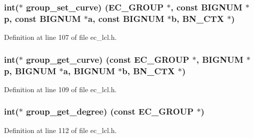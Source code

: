 \subsubsection[{\texorpdfstring{group\+\_\+set\+\_\+curve}{group_set_curve}}]{\setlength{\rightskip}{0pt plus 5cm}int($\ast$ group\+\_\+set\+\_\+curve) ({\bf E\+C\+\_\+\+G\+R\+O\+UP} $\ast$, const {\bf B\+I\+G\+N\+UM} $\ast${\bf p}, const {\bf B\+I\+G\+N\+UM} $\ast${\bf a}, const {\bf B\+I\+G\+N\+UM} $\ast$b, {\bf B\+N\+\_\+\+C\+TX} $\ast$)}\hypertarget{structec__method__st_a5941d4f307f38861f005688e0f818ecf}{}\label{structec__method__st_a5941d4f307f38861f005688e0f818ecf}


Definition at line 107 of file ec\+\_\+lcl.\+h.

\subsubsection[{\texorpdfstring{group\+\_\+get\+\_\+curve}{group_get_curve}}]{\setlength{\rightskip}{0pt plus 5cm}int($\ast$ group\+\_\+get\+\_\+curve) (const {\bf E\+C\+\_\+\+G\+R\+O\+UP} $\ast$, {\bf B\+I\+G\+N\+UM} $\ast${\bf p}, {\bf B\+I\+G\+N\+UM} $\ast${\bf a}, {\bf B\+I\+G\+N\+UM} $\ast$b, {\bf B\+N\+\_\+\+C\+TX} $\ast$)}\hypertarget{structec__method__st_a9c81f1473076ba3a9b85a7ecf8d84e64}{}\label{structec__method__st_a9c81f1473076ba3a9b85a7ecf8d84e64}


Definition at line 109 of file ec\+\_\+lcl.\+h.

\subsubsection[{\texorpdfstring{group\+\_\+get\+\_\+degree}{group_get_degree}}]{\setlength{\rightskip}{0pt plus 5cm}int($\ast$ group\+\_\+get\+\_\+degree) (const {\bf E\+C\+\_\+\+G\+R\+O\+UP} $\ast$)}\hypertarget{structec__method__st_a7cad48923884aa4c25e0fcf5fa3ee8cc}{}\label{structec__method__st_a7cad48923884aa4c25e0fcf5fa3ee8cc}


Definition at line 112 of file ec\+\_\+lcl.\+h.

